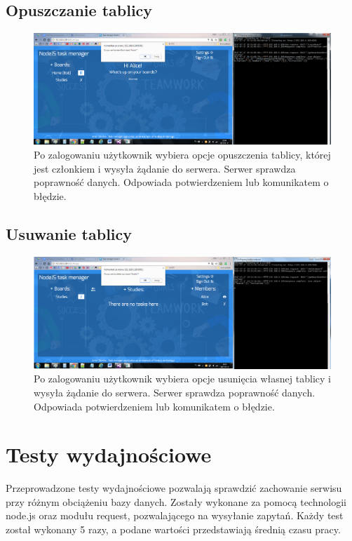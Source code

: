 \documentclass[12pt]{report}
\begin{document}
\subsection{Opuszczanie tablicy}
\begin{figure}[!hb]
\centering
\includegraphics[width=\textwidth,height=\textheight,keepaspectratio]{D2.png}
\captionsetup{labelformat=empty}
\caption[]{Po zalogowaniu użytkownik wybiera opcje opuszczenia tablicy, której jest członkiem i wysyła żądanie do serwera. 
Serwer sprawdza poprawność danych. Odpowiada potwierdzeniem lub komunikatem o błędzie.}
\end{figure}

\subsection{Usuwanie tablicy}
\begin{figure}[!hb]
\centering
\includegraphics[width=\textwidth,height=\textheight,keepaspectratio]{E2.png}
\captionsetup{labelformat=empty}
\caption[]{Po zalogowaniu użytkownik wybiera opcje usunięcia własnej tablicy i wysyła żądanie do serwera. Serwer sprawdza poprawność danych. Odpowiada potwierdzeniem lub komunikatem o błędzie.}
\end{figure}


\section{Testy wydajnościowe}
Przeprowadzone testy wydajnościowe pozwalają sprawdzić zachowanie serwisu przy różnym obciążeniu bazy danych. Zostały wykonane za pomocą technologii node.js oraz modułu request, pozwalającego na wysyłanie zapytań. Każdy test został wykonany 5 razy, a podane wartości przedstawiają średnią czasu pracy.
\end{document}

